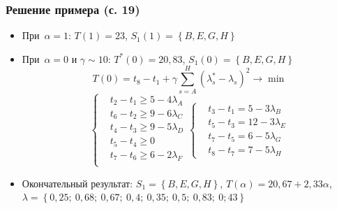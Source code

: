 \documentclass[12pt]{beamer}
\begin{document}
\begin{frame}
  \frametitle{Решение примера (с. 19)}
  \begin{itemize}
    \item При~$\alpha=1$: $T\left( 1 \right)=23$, $S_1\left( 1 \right)=\left\{ B,E,G,H \right\}$
    \item При~$\alpha=0$ и $\gamma \sim 10$: $T^*\left( 0 \right)=20,83$, $S_1\left( 0 \right)=\left\{ B,E,G,H \right\}$
      \begin{equation}
      \label{eq:0-level-fcpm-task}
        T\left( 0 \right)=t_8-t_1+\gamma \sum\limits_{s=A}^{H}\left( \lambda_{s}^{*}-\lambda_s \right)^{2}\to \min
      \end{equation}
      \begin{equation}
      \label{eq:0-level-fcpm-constraints}
        \left\{ \begin{aligned}
          & t_2-t_1 \geqslant 5-4\lambda_A \\ 
          & t_6-t_2 \geqslant 9-6\lambda_C \\ 
          & t_4-t_3 \geqslant 9-5\lambda_D \\ 
          & t_5-t_4 \geqslant 0 \\ 
          & t_7-t_6 \geqslant 6-2\lambda_F \\ 
        \end{aligned} \right.
        \left\{ \begin{aligned}
          & t_3-t_1=5-3\lambda_B \\ 
          & t_5-t_3=12-3\lambda_E \\ 
          & t_7-t_5=6-5\lambda_G \\ 
          & t_8-t_7=7-5\lambda_H
        \end{aligned} \right.
      \end{equation}
    \item Окончательный результат: $S_1=\left\{ B,E,G,H \right\}$, $T\left( \alpha \right)=20,67+2,33\alpha$, $\lambda =\left\{ 0,25;\ 0,68;\ 0,67;\ 0,4;\ 0,35;\ 0,5;\ 0,83;\ 0;43 \right\}$
  \end{itemize}
\end{frame}
\end{document}
